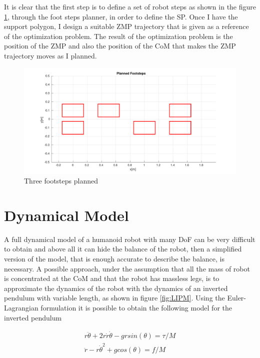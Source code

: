 \documentclass[a4paper]{article}
\begin{document}
It is clear that the first step is to define a set of robot steps as shown in the figure \ref{fig:footsteps}, through the foot steps planner, in order to define the SP. Once I have the support polygon, I design a suitable ZMP trajectory that is given as a reference of the optimization problem. The result of the optimization problem is the position of the ZMP and also the position of the CoM that makes the ZMP trajectory moves as I planned. 

\begin{figure}
 \centering
 \includegraphics[width=\textwidth]{plot/optimization/footsteps.pdf}
 \caption{Three footsteps planned}
 \label{fig:footsteps}
\end{figure}

\section{Dynamical Model}

A full dynamical model of a humanoid robot with many DoF can be very difficult to obtain and above all it can hide the balance of the robot, then a simplified version of the model, that is enough accurate to describe the balance, is necessary. 
A possible approach, under the assumption that all the mass of robot is concentrated at the CoM and that the robot has massless legs, is to approximate the dynamics of the robot with the dynamics of an inverted pendulum with variable length,  as shown in figure \ref{fig:LIPM}. Using the Euler-Lagrangian formulation it is possible to obtain the following model for the inverted pendulum

\begin{equation}
\begin{aligned}
r\ddot{\theta}+2r\dot{r}\dot{\theta}-grsin(\theta)=\tau/M\\
\ddot{r}-r\dot{\theta}^2+gcos(\theta) = f/M
\end{aligned}
\end{equation}
\end{document}

